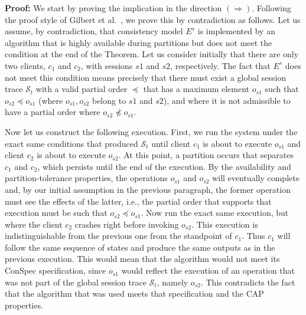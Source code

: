 \documentclass[journal,compsoc]{IEEEtran}
\begin{document}

\par \textbf{Proof:} We start by proving the implication in the direction $(\Rightarrow)$. Following the proof style of Gilbert et al.~\cite{Gilbert:2002:BCF:564585.564601}, we prove this by contradiction as follows.  Let us assume, by contradiction, that consistency model $E^s$ is implemented by an algorithm that is highly available during partitions but does not meet the condition at the end of the Theorem. Let us consider initially that there are only two clients, $c_1$ and $c_2$, with sessions $s1$ and $s2$, respectively. The fact that $E^s$  does not meet this condition means precisely that there must exist a global session trace $\mathcal{S}_t$ with a valid partial order $\preccurlyeq$ that has a maximum element $o_{s1}$ such that $o_{s2}\preccurlyeq o_{s1}$ (where $o_{s1},o_{s2}$ belong to $s1$ and $s2$), and where it is not admissible to have a partial order where $o_{s2}\not\preccurlyeq o_{s1}$.

Now let us construct the following execution. First, we run the system under the exact same conditions that produced $\mathcal{S}_t$ until client $c_1$ is about to execute $o_{s1}$ and client $c_2$ is about to execute $o_{s2}$. At this point, a partition occurs that separates $c_1$ and $c_2$, which persists until the end of the execution. By the availability and partition-tolerance properties, the operations $o_{s1}$ and $o_{s2}$ will eventually complete and, by our initial assumption in the previous paragraph, the former operation must see the effects of the latter, i.e., the partial order that supports that execution must be such that $o_{s2}\preccurlyeq o_{s1}$. Now run the exact same execution, but where the client $c_2$ crashes right before invoking $o_{s2}$. This execution is indistinguishable from the previous one from the standpoint of $c_1$. Thus $c_1$ will follow the same sequence of states and produce the same outputs as in the previous execution. This would mean that the algorithm would not meet its ConSpec specification, since $o_{s1}$ would reflect the execution of an operation that was not part of the global session trace $\mathcal{S}_t$, namely $o_{s2}$. This contradicts the fact that the algorithm that was used meets that specification and the CAP properties.
\end{document}
